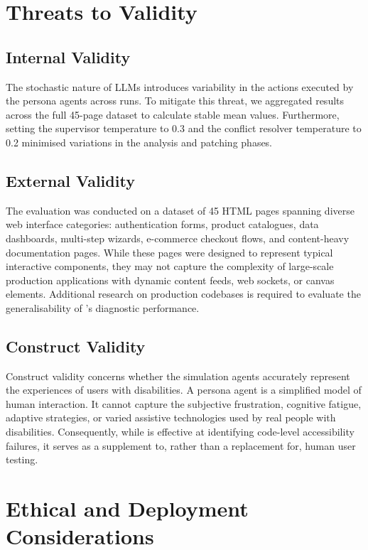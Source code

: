 \section{Threats to Validity}
\label{sec:threats}

\subsection{Internal Validity}
The stochastic nature of LLMs introduces variability in the actions executed by the persona agents across runs. To mitigate this threat, we aggregated results across the full 45-page dataset to calculate stable mean values. Furthermore, setting the supervisor temperature to 0.3 and the conflict resolver temperature to 0.2 minimised variations in the analysis and patching phases.

\subsection{External Validity}
The evaluation was conducted on a dataset of 45 HTML pages spanning diverse web interface categories: authentication forms, product catalogues, data dashboards, multi-step wizards, e-commerce checkout flows, and content-heavy documentation pages. While these pages were designed to represent typical interactive components, they may not capture the complexity of large-scale production applications with dynamic content feeds, web sockets, or canvas elements. Additional research on production codebases is required to evaluate the generalisability of \versimux{}'s diagnostic performance.

\subsection{Construct Validity}
Construct validity concerns whether the simulation agents accurately represent the experiences of users with disabilities. A persona agent is a simplified model of human interaction. It cannot capture the subjective frustration, cognitive fatigue, adaptive strategies, or varied assistive technologies used by real people with disabilities. Consequently, while \versimux{} is effective at identifying code-level accessibility failures, it serves as a supplement to, rather than a replacement for, human user testing.


\section{Ethical and Deployment Considerations}
\label{sec:ethics}

